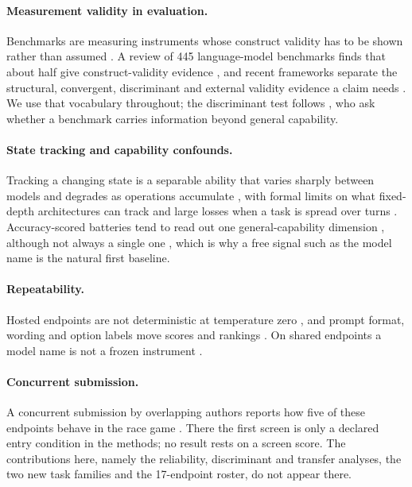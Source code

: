 \documentclass[11pt]{article}
\begin{document}
\paragraph{Measurement validity in evaluation.}
Benchmarks are measuring instruments whose construct validity has to be shown
rather than assumed \citep{raji2021ai,jacobs2021measurement}. A review of 445
language-model benchmarks finds that about half give construct-validity
evidence \citep{bean2025measuring}, and recent frameworks separate the
structural, convergent, discriminant and external validity evidence a claim
needs \citep{salaudeen2025measurement,wallach2025position}. We use that
vocabulary throughout; the discriminant test follows \citet{ren2024safetywashing},
who ask whether a benchmark carries information beyond general capability.

\paragraph{State tracking and capability confounds.}
Tracking a changing state is a separable ability that varies sharply between
models and degrades as operations accumulate
\citep{kim2023entity,li2021implicit,toshniwal2022chess}, with formal limits on
what fixed-depth architectures can track \citep{merrill2024illusion} and large
losses when a task is spread over turns \citep{laban2026llms}. Accuracy-scored
batteries tend to read out one general-capability dimension
\citep{ruan2024observational,ilic2024evidence}, although not always a single
one \citep{burnell2023revealing}, which is why a free signal such as the model
name is the natural first baseline.

\paragraph{Repeatability.}
Hosted endpoints are not deterministic at temperature zero
\citep{atil2025nondeterminism,ouyang2025empirical}, and prompt format, wording
and option labels move scores and rankings
\citep{sclar2024quantifying,mizrahi2024state,zheng2024large}. On shared
endpoints a model name is not a frozen instrument \citep{zhu2026clean}.

\paragraph{Concurrent submission.}
A concurrent submission by overlapping authors reports how five of these
endpoints behave in the race game \citep{anonymous-concurrent}. There the first
screen is only a declared entry condition in the methods; no result rests on a
screen score. The contributions here, namely the reliability, discriminant and
transfer analyses, the two new task families and the 17-endpoint roster, do
not appear there.
\end{document}
